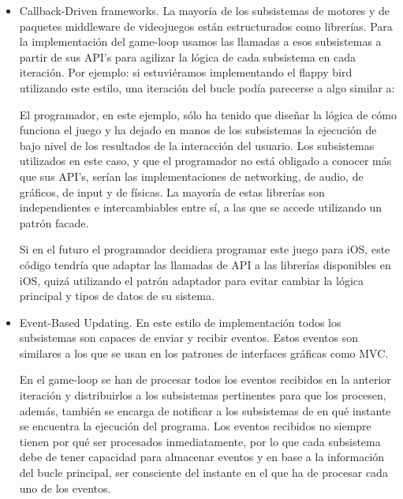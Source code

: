 \documentclass[a4paper,12pt]{report}
\begin{document}
	\begin{itemize}
		\item Callback-Driven frameworks. La mayoría de los subsistemas de motores y de paquetes middleware de videojuegos están estructurados como librerías. Para la implementación del game-loop usamos las llamadas a esos subsistemas a partir de sus API's para agilizar la lógica de cada subsistema en cada iteración. Por ejemplo: si estuviéramos implementando el flappy bird utilizando este estilo, una iteración del bucle podía parecerse a algo similar a:
		
		
		El programador, en este ejemplo, sólo ha tenido que diseñar la lógica de cómo funciona el juego y ha dejado en manos de los subsistemas la ejecución de bajo nivel de los resultados de la interacción del usuario. Los subsistemas utilizados en este caso, y que el programador no está obligado a conocer más que sus API's, serían las implementaciones de networking, de audio, de gráficos, de input y de físicas. La mayoría de estas librerías son independientes e intercambiables entre sí, a las que se accede utilizando un patrón facade.
		
		Si en el futuro el programador decidiera programar este juego para iOS, este código tendría que adaptar las llamadas de API a las librerías disponibles en iOS, quizá utilizando el patrón adaptador para evitar cambiar la lógica principal y tipos de datos de su sistema.	
		
		\item Event-Based Updating. En este estilo de implementación todos los subsistemas son capaces de enviar y recibir eventos. Estos eventos son similares a los que se usan en los patrones de interfaces gráficas como MVC. 
		
		En el game-loop se han de procesar todos los eventos recibidos en la anterior iteración y distribuirlos a los subsistemas pertinentes para que los procesen, además, también se encarga de notificar a los subsistemas de en qué instante se encuentra la ejecución del programa. Los eventos recibidos no siempre tienen por qué ser procesados inmediatamente, por lo que cada subsistema debe de tener capacidad para almacenar eventos y en base a la información del bucle principal, ser consciente del instante en el que ha de procesar cada uno de los eventos. 
		

\end{itemize}
\end{document}
